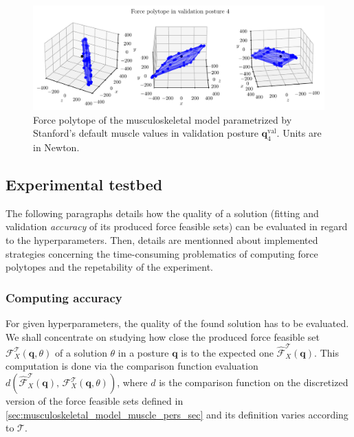 \begin{figure}[!htb]
    \centering
    \captionsetup{justification=centering}
    \begin{minipage}{\linewidth}
        \centering
        \includegraphics[trim={0 0 0 0}, clip, width=1\linewidth]{img/chapter_4/reconstruction_stanford_imgs/STANFORD_POSTURE_VAL_04.pdf}
    \end{minipage}
    \caption{Force polytope of the musculoskeletal model parametrized by Stanford's default muscle values in validation posture $\mathbf{q}_4^{\text{val}}$. Units are in Newton.}
    \label{fig:polytope_val_pose_4}
\end{figure}

\subsection{Experimental testbed}
The following paragraphs details how the quality of a solution (fitting and validation \emph{accuracy} of its produced force feasible sets) can be evaluated in regard to the hyperparameters. Then, details are mentionned about implemented strategies concerning the time-consuming problematics of computing force polytopes and the repetability of the experiment.

\subsubsection*{Computing accuracy}
For given hyperparameters, the quality of the found solution has to be evaluated. We shall concentrate on studying how close the produced force feasible set $\mathcal{F}_X^{\mathcal{T}}(\mathbf{q}, \theta)$ of a solution $\theta$ in a posture $\mathbf{q}$ is to the expected one $\hat{\mathcal{F}}_X^{\mathcal{T}}(\mathbf{q})$. This computation is done via the comparison function evaluation $d(\hat{\mathcal{F}}_X^{\mathcal{T}}(\mathbf{q}), \, \mathcal{F}_X^{\mathcal{T}}(\mathbf{q}, \theta))$, where $d$ is the comparison function on the discretized version of the force feasible sets defined in \ref{sec:musculoskeletal_model_muscle_pers_sec} and its definition varies according to $\mathcal{T}$.

